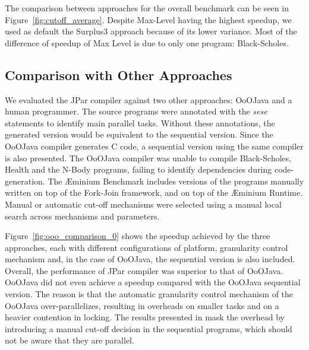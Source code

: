 \documentclass[smallextended]{svjour3}
\begin{document}
The comparison between approaches for the overall benchmark can be seen in Figure~\ref{fig:cutoff_average}. Despite Max-Level having the highest speedup, we used as default the Surplus3 approach because of its lower variance. Most of the difference of speedup of Max Level is due to only one program: Black-Scholes.


\subsection{Comparison with Other Approaches}

We evaluated the JPar compiler against two other approaches: OoOJava and a human programmer. The source programs were annotated with the \emph{sese} statements to identify main parallel tasks. Without these annotations, the generated version would be equivalent to the sequential version. Since the OoOJava compiler generates C code, a sequential version using the same compiler is also presented. The OoOJava compiler was unable to compile Black-Scholes, Health and the N-Body programs, failing to identify dependencies during code-generation. The Æminium Benchmark includes versions of the programs manually written on top of the Fork-Join framework, and on top of the Æminium Runtime. Manual or automatic cut-off mechanisms were selected using a manual local search across mechanisms and parameters.



Figure~\ref{fig:ooo_comparison_0} shows the speedup achieved by the three approaches, each with different configurations of platform, granularity control mechanism and, in the case of OoOJava, the sequential version is also included. Overall, the performance of JPar compiler was superior to that of OoOJava. OoOJava did not even achieve a speedup compared with the OoOJava sequential version. The reason is that the automatic granularity control mechanism of the OoOJava over-parallelizes, resulting in overheads on smaller tasks and on a heavier contention in locking. The results presented in \cite{jenista2011ooojava} mask the overhead by introducing a manual cut-off decision in the sequential programs, which should not be aware that they are parallel.
\end{document}
